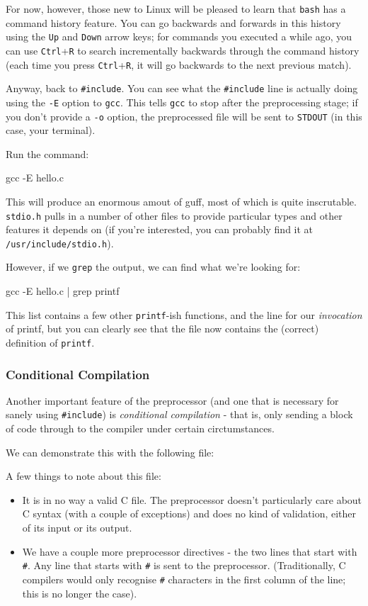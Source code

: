 \documentclass[a4paper,10pt]{article}
\newcommand{\kw}[1]{\texttt{#1}}
\newcommand{\key}[1]{\texttt{#1}}
\newcommand{\filename}[1]{\texttt{#1}}
\newcommand{\tool}[1]{\texttt{#1}}
\newcommand{\drmcode}[3]{\noindent\begin{minipage}{\columnwidth}\end{minipage}}
\newcommand{\cfile}[1]{\drmcode{C}{\filename{#1}}{#1}}
\begin{document}
For now, however, those new to Linux will be pleased to learn that
\kw{bash} has a command history feature. You can go backwards and
forwards in this history using the \key{Up} and \key{Down} arrow keys;
for commands you executed a while ago, you can use \key{Ctrl}+\key{R}
to search incrementally backwards through the command history (each
time you press \key{Ctrl}+\key{R}, it will go backwards to the next
previous match).

Anyway, back to \verb!#include!. You can see what the \verb!#include!
  line is actually doing using the \kw{-E} option to \tool{gcc}. This
  tells \tool{gcc} to stop after the preprocessing stage; if you don't
  provide a \kw{-o} option, the preprocessed file will be sent to
  \kw{STDOUT} (in this case, your terminal).

Run the command:

\bash[script]
gcc -E hello.c
\END

\noindent
This will produce an enormous amout of guff, most of which is quite
inscrutable. \filename{stdio.h} pulls in a number of other files to
provide particular types and other features it depends on (if you're
interested, you can probably find it at \filename{/usr/include/stdio.h}).

However, if we \tool{grep} the output, we can find what we're looking
for:

gcc -E hello.c | grep printf
\END

\noindent
This list contains a few other \kw{printf}-ish functions, and the line
for our \emph{invocation} of printf, but you can clearly see that the
file now contains the (correct) definition of \kw{printf}.

\subsubsection{Conditional Compilation}

Another important feature of the preprocessor (and one that is
necessary for sanely using \verb!#include!) is \emph{conditional
  compilation} - that is, only sending a block of code through to the
compiler under certain circtumstances.

We can demonstrate this with the following file:

\cfile{cond.c}

A few things to note about this file:

\begin{itemize}
\item It is in no way a valid C file. The preprocessor doesn't
  particularly care about C syntax (with a couple of exceptions) and
  does no kind of validation, either of its input or its output.
\item We have a couple more preprocessor directives - the two lines
  that start with \verb!#!. Any line that starts with \verb!#! is sent
  to the preprocessor. (Traditionally, C compilers would only
  recognise \verb!#! characters in the first column of the line; this
  is no longer the case).
\end{itemize}
\end{document}
